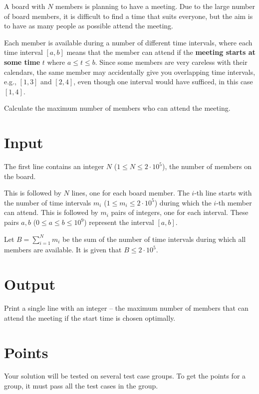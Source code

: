 \noindent
A board with $N$ members is planning to have a meeting.
Due to the large number of board members, it is difficult to find a time that suits everyone, but the aim is to have as many people as possible attend the meeting.

Each member is available during a number of different time intervals, where each time interval $[a, b]$ means that the member can attend if the \textbf{meeting starts at some time} $t$ where $a \le t \le b$.
Since some members are very careless with their calendars, the same member may accidentally give you overlapping time intervals, e.g., $[1, 3]$ and $[2, 4]$, even though one interval would have sufficed, in this case $[1, 4]$.

Calculate the maximum number of members who can attend the meeting.

\section*{Input}
The first line contains an integer $N$ ($1 \le N \leq 2\cdot 10^5$), the number of members on the board.

This is followed by $N$ lines, one for each board member.
The $i$-th line starts with the number of time intervals $m_i$ ($1 \leq m_i \leq 2\cdot 10^5$) during which the $i$-th member can attend.
This is followed by $m_i$ pairs of integers, one for each interval.
These pairs $a, b$ ($0 \le a \le b \le 10^9$) represent the interval $[a, b]$.

Let $B=\sum_{i=1}^{N} m_i$ be the sum of the number of time intervals during which all members are available.
It is given that $B \leq 2\cdot 10^5$.

\section*{Output}
Print a single line with an integer -- the maximum number of members that can attend the meeting if the start time is chosen optimally.

\section*{Points}
Your solution will be tested on several test case groups.
To get the points for a group, it must pass all the test cases in the group.

